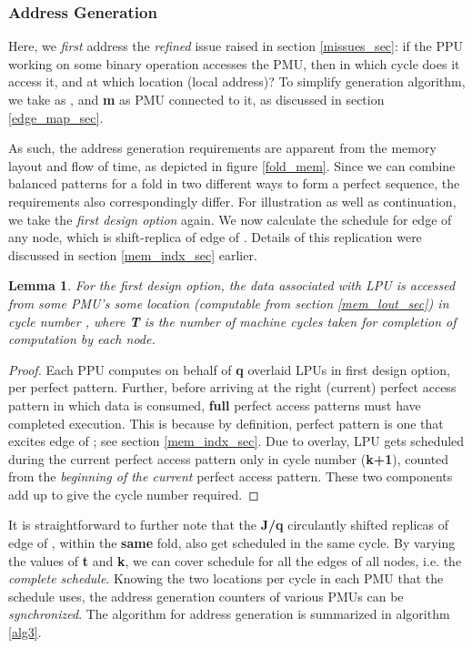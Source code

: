 \documentclass[12pt]{article}
\newtheorem{lem}[thm]{Lemma}
\begin{document}
\subsubsection{Address Generation}
\label{add_gen_sec}

Here, we \textit{first} address the \textit{refined}  issue raised in section
\ref{missues_sec}: if the PPU 
working on some binary operation accesses the  PMU, then in which cycle does it access it, and at which location (local
address)? To simplify generation
algorithm, we take  as , and \textbf{m} as 
PMU connected to it, as discussed in section \ref{edge_map_sec}.

As such, the address generation requirements are apparent from the memory layout
and flow of time, as depicted in figure \ref{fold_mem}. Since we can
combine balanced patterns for a fold in two different ways to form a
perfect sequence, the requirements also correspondingly differ. For
illustration as well as continuation, we take the \textit{first
design option} again.
We now calculate the schedule for  edge of any
node, which is shift-replica of  edge of . Details of
this replication were discussed in section \ref{mem_indx_sec} earlier.

\begin{lem}
\label{lem1}
For the first design option, the  data associated with LPU  is accessed from some PMU's some
location (computable from section \ref{mem_lout_sec}) in cycle number
{\large }, where \textbf{T} is the number of machine cycles
taken for completion of computation by each node.
\end{lem}

\begin{proof}
Each PPU computes on behalf of \textbf{q} overlaid LPUs in first design option, per perfect
pattern. Further, before arriving at the right (current) perfect access pattern
in which  data is consumed, {\large }
\textbf{full} perfect access patterns must have completed execution. This
is because by definition,  perfect pattern is one that excites  edge of ; see section
\ref{mem_indx_sec}. Due to overlay, 
LPU  gets scheduled during the current
perfect access pattern only in cycle number (\textbf{k+1}),
counted from the \textit{beginning of the current} perfect access pattern. These two
components add up to give the cycle number required.
\end{proof}

It is straightforward to further note that the \textbf{J/q}
circulantly shifted replicas of  edge of , within the
\textbf{same} fold, also get scheduled in the same cycle. By
varying the values of \textbf{t} and \textbf{k}, we
can cover schedule for all the edges of all nodes, i.e. the
\textit{complete schedule}. Knowing the two
locations per cycle in each PMU that the schedule uses, the address
generation counters of various PMUs can be \textit{synchronized}.
The algorithm for address generation is
summarized in algorithm \ref{alg3}.
\end{document}
